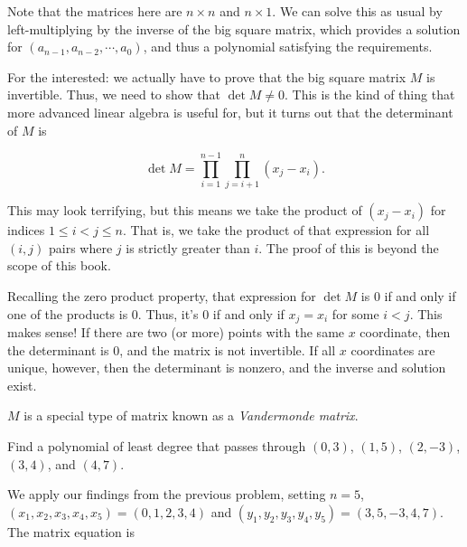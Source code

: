 \documentclass[../key.tex]{subfiles}
\begin{document}
Note that the matrices here are $n\times n$ and $n\times 1$. We can solve this as usual by left-multiplying by the inverse of the big square matrix, which provides a solution for $(a_{n-1}, a_{n-2}, \cdots, a_0)$, and thus a polynomial satisfying the requirements.

For the interested: we actually have to prove that the big square matrix $M$ is invertible. Thus, we need to show that $\det M \neq 0$. This is the kind of thing that more advanced linear algebra is useful for, but it turns out that the determinant of $M$ is

$$\det M = \prod _ {i=1} ^ {n-1} \prod_{j=i+1} ^ {n} (x_j - x_i).$$

This may look terrifying, but this means we take the product of $(x_j - x_i)$ for indices $1\leq i < j\leq n$. That is, we take the product of that expression for all $(i,j)$ pairs where $j$ is strictly greater than $i$. The proof of this is beyond the scope of this book.

Recalling the zero product property, that expression for $\det M$ is $0$ if and only if one of the products is $0$. Thus, it's $0$ if and only if $x_j = x_i$ for some $i<j$. This makes sense! If there are two (or more) points with the same $x$ coordinate, then the determinant is $0$, and the matrix is not invertible. If all $x$ coordinates are unique, however, then the determinant is nonzero, and the inverse and solution exist.

$M$ is a special type of matrix known as a \textit{Vandermonde matrix}.

\begin{inner_problem}
\item Find a polynomial of least degree that passes through $(0,3)$, $(1,5)$, $(2,-3)$, $(3,4)$, and $(4,7)$.
\end{inner_problem}

We apply our findings from the previous problem, setting $n=5$, $(x_1,x_2,x_3,x_4,x_5)=(0,1,2,3,4)$ and $(y_1,y_2,y_3,y_4,y_5)=(3,5,-3,4,7)$. The matrix equation is
\end{document}
